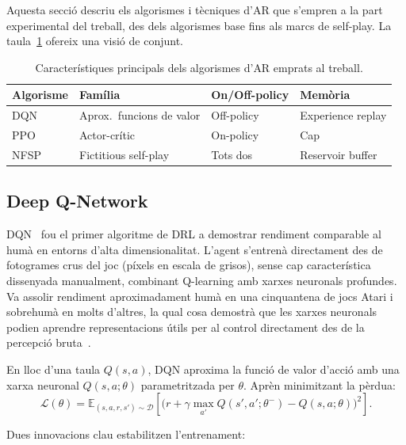 Aquesta secció descriu els algorismes i tècniques d'\ac{AR} que s'empren a la
part experimental del treball, des dels algorismes base fins als marcs de
self-play. La taula~\ref{tab:comparativa-algorismes} ofereix una visió de conjunt.

\begin{table}[H]
  \centering
  \caption{Característiques principals dels algorismes d'\acs{AR} emprats al treball.}
  \label{tab:comparativa-algorismes}
  \begin{tabular}{llll}
    \toprule
    \textbf{Algorisme} & \textbf{Família} & \textbf{On/Off-policy} & \textbf{Memòria} \\
    \midrule
    \acs{DQN}~\cite{mnih2015dqn}      & Aprox.\ funcions de valor & Off-policy & Experience replay  \\
    \acs{PPO}~\cite{schulman2017ppo}  & Actor-crític              & On-policy  & Cap                \\
    \acs{NFSP}~\cite{heinrich2016nfsp} & Fictitious self-play     & Tots dos   & Reservoir buffer   \\
    \bottomrule
  \end{tabular}
\end{table}

\subsection{Deep Q-Network}
\label{sec:dqn}

\ac{DQN}~\cite{mnih2015dqn} fou el primer algoritme de \ac{DRL} a demostrar
rendiment comparable al humà en entorns d'alta dimensionalitat. L'agent
s'entrenà directament des de fotogrames crus del joc (píxels en escala de
grisos), sense cap característica dissenyada manualment, combinant Q-learning
amb xarxes neuronals profundes. Va assolir rendiment aproximadament humà en una
cinquantena de jocs Atari i sobrehumà en molts d'altres, la qual cosa demostrà
que les xarxes neuronals podien aprendre representacions útils per al control
directament des de la percepció bruta~\cite{mnih2015dqn}.

En lloc d'una taula $Q(s,a)$, \ac{DQN} aproxima la funció de valor d'acció
amb una xarxa neuronal $Q(s,a;\theta)$ parametritzada per $\theta$. Aprèn
minimitzant la pèrdua:
\[
  \mathcal{L}(\theta) =
  \mathbb{E}_{(s,a,r,s') \sim \mathcal{D}}\!\left[
    \bigl(r + \gamma \max_{a'} Q(s',a';\theta^{-}) - Q(s,a;\theta)\bigr)^2
  \right].
\]

Dues innovacions clau estabilitzen l'entrenament:

